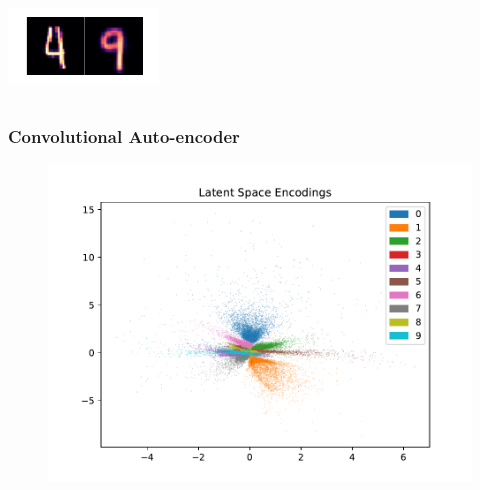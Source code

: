 \documentclass[10pt, usenames, dvipsnames, table]{beamer}
\begin{document}
\begin{frame}
\begin{columns}
    \includegraphics[width=\linewidth]
    {models/mnist_conv_e300_L2_b64/reconstruction_5}
  \end{columns}
\end{frame}

\begin{frame}
  \frametitle{Convolutional Auto-encoder}
  \begin{figure}
    \centering
    \includegraphics[width=\linewidth]
    {models/mnist_conv_e300_L2_b64/encodings}
    \caption{}
    \label{fig:conv-encodings}
  \end{figure}
\end{frame}
\end{document}
